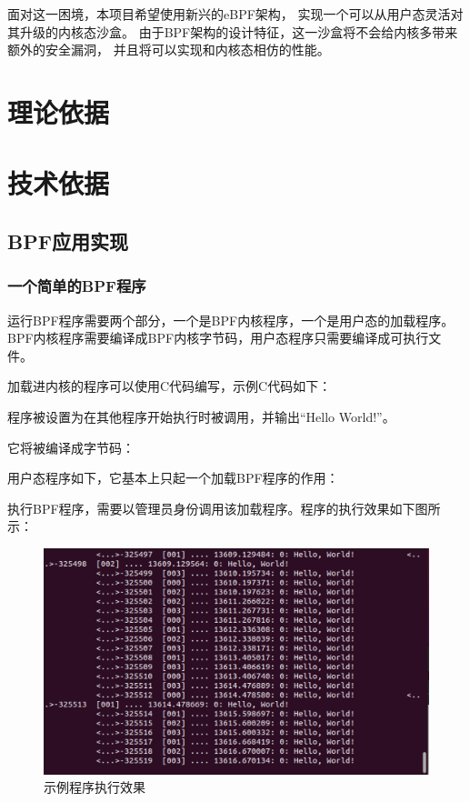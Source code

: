 \documentclass[AutoFakeBold,a4paper]{ctexart}
\begin{document}
面对这一困境，本项目希望使用新兴的eBPF架构，
实现一个可以从用户态灵活对其升级的内核态沙盒。
由于BPF架构的设计特征，这一沙盒将不会给内核多带来额外的安全漏洞，
并且将可以实现和内核态相仿的性能。

\section{理论依据}


\section{技术依据}

\subsection{BPF应用实现}

\subsubsection{一个简单的BPF程序}

运行BPF程序需要两个部分，一个是BPF内核程序，一个是用户态的加载程序。
BPF内核程序需要编译成BPF内核字节码，用户态程序只需要编译成可执行文件。

加载进内核的程序可以使用C代码编写，示例C代码如下：



程序被设置为在其他程序开始执行时被调用，并输出“Hello World!”。

它将被编译成字节码：



用户态程序如下，它基本上只起一个加载BPF程序的作用：



执行BPF程序，需要以管理员身份调用该加载程序。程序的执行效果如下图所示：

\begin{figure}[H]
    \centering
    \includegraphics[width=0.7\columnwidth]{../LiangHengyu/hello_world/test1.png}
    \caption{示例程序执行效果}
\end{figure}
\end{document}
